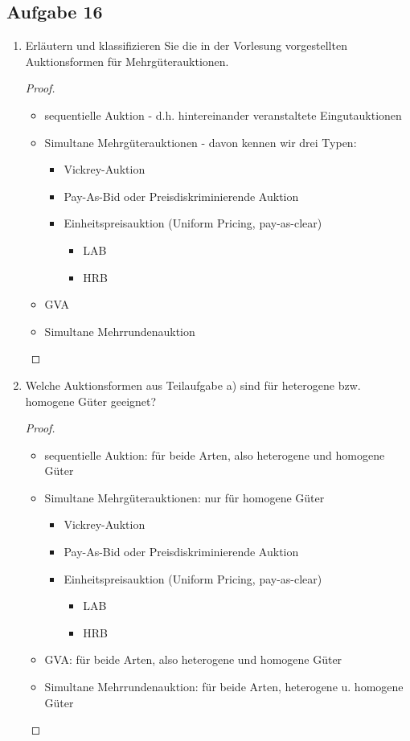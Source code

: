 \documentclass[12pt]{extreport} %
\theoremstyle{named}
\theoremstyle{itshape}
\theoremstyle{normal}
\begin{document}
\subsection*{Aufgabe 16}

\begin{enumerate}
	\item Erläutern und klassifizieren Sie die in der Vorlesung vorgestellten Auktionsformen für Mehrgüterauktionen.
		\begin{proof} ~\
		  \begin{itemize}
			\item sequentielle Auktion - d.h. hintereinander veranstaltete Eingutauktionen
			\item Simultane Mehrgüterauktionen - davon kennen wir drei Typen:
				\begin{itemize}
					\item Vickrey-Auktion
					\item Pay-As-Bid oder Preisdiskriminierende Auktion
					\item Einheitspreisauktion (Uniform Pricing, pay-as-clear)
						\begin{itemize}
							\item LAB
							\item HRB
						\end{itemize}
				\end{itemize}
			\item GVA
			\item Simultane Mehrrundenauktion
		  \end{itemize}
		\end{proof}
	\item Welche Auktionsformen aus Teilaufgabe a) sind für heterogene bzw. homogene Güter geeignet?
		\begin{proof} ~\
		  \begin{itemize}
			\item sequentielle Auktion: für beide Arten, also heterogene und homogene Güter
			\item Simultane Mehrgüterauktionen: nur für homogene Güter
				\begin{itemize}
					\item Vickrey-Auktion
					\item Pay-As-Bid oder Preisdiskriminierende Auktion
					\item Einheitspreisauktion (Uniform Pricing, pay-as-clear)
						\begin{itemize}
							\item LAB
							\item HRB
						\end{itemize}
				\end{itemize}
			\item GVA: für beide Arten, also heterogene und homogene Güter
			\item Simultane Mehrrundenauktion: für beide Arten, heterogene u. homogene Güter
		  \end{itemize}
		\end{proof}
\end{enumerate}
\end{document}
